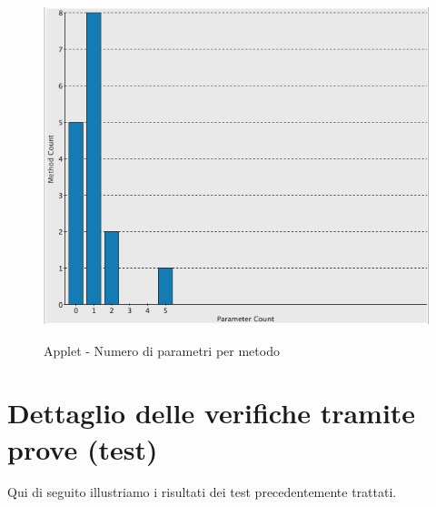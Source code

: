\begin{figure}[htbp]
  \centering
  \includegraphics[height=10cm]{img/PQ/NumberOfParametersAPPLET.png}
\caption{Applet - Numero di parametri per metodo}
\end{figure}

\newpage

\section{Dettaglio delle verifiche tramite prove (test)}
Qui di seguito illustriamo i risultati dei test precedentemente trattati.
